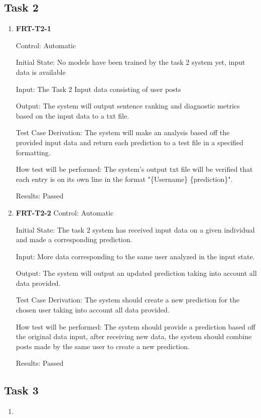\documentclass[12pt, titlepage]{article}
\begin{document}
\subsection{Task 2}

 \begin{enumerate}
 
 \item \textbf{FRT-T2-1}

Control: Automatic

Initial State: No models have been trained by the task 2 system yet, input data is available

Input: The Task 2 Input data consisting of user posts

Output: The system will output sentence ranking and diagnostic metrics based on the input data to a txt file.

Test Case Derivation: The system will make an analysis based off the provided input data and return each prediction to a test file in a specified formatting.

How test will be performed: The system's output txt file will be verified that each entry is on its own line in the format "\{Username\} \{prediction\}".

Results: Passed

 \item \textbf{FRT-T2-2}
 Control: Automatic

Initial State: The task 2 system has received input data on a given individual and made a corresponding prediction.

Input: More data corresponding to the same user analyzed in the input state.

Output: The system will output an updated prediction taking into account all data provided.

Test Case Derivation: The system should create a new prediction for the chosen user taking into account all data provided.

How test will be performed: The system should provide a prediction based off the original data input, after receiving new data, the system should combine posts made by the same user to create a new prediction. 

Results: Passed
 \end{enumerate}

 \subsection{Task 3}
 \begin{enumerate}
     \item 
 \end{enumerate}
\end{document}
